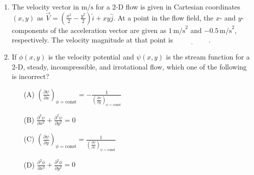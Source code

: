 \documentclass[journal,12pt,onecolumn]{IEEEtran}
\theoremstyle{remark}
\begin{document}
\begin{enumerate}
\begin{figure}[!ht]
{\begin{circuitikz}
\end{circuitikz}
}%
\end{figure}
    
    \item The velocity vector in $\text{m/s}$ for a 2-D flow is given in Cartesian coordinates $(x, y)$ as $\vec{V} = \left( \frac{x^2}{2} - \frac{y^2}{2} \right) \hat{i} + xy \hat{j}$. At a point in the flow field, the $x$- and $y$-components of the acceleration vector are given as $1 \, \text{m/s}^2$ and $-0.5 \, \text{m/s}^2$, respectively. The velocity magnitude at that point is $\underline{\hspace{2cm}}$.
\item  If $\phi(x, y)$ is the velocity potential and $\psi(x, y)$ is the stream function for a 2-D, steady, incompressible, and irrotational flow, which one of the following is incorrect?
\begin{enumerate}
    \item[(A)] $\left( \frac{\partial \psi}{\partial x} \right)_{\phi= \text{const}}  = -\frac{1}{\left( \frac{\partial \psi}{\partial y} \right)_{\psi= \text{const}}}$
    \item[(B)] $\frac{\partial^2 \psi}{\partial x^2} + \frac{\partial^2 \psi}{\partial y^2} = 0$
    \item[(C)] $\left( \frac{\partial \psi}{\partial y} \right)_{\phi= \text{const}} =  \frac{1}{\left( \frac{\partial \psi}{\partial x} \right)_{\psi= \text{const}}}$
    \item[(D)] $\frac{\partial^2 \phi}{\partial x^2} + \frac{\partial^2 \phi}{\partial y^2} = 0$
\end{enumerate}


\end{enumerate}
\end{document}
